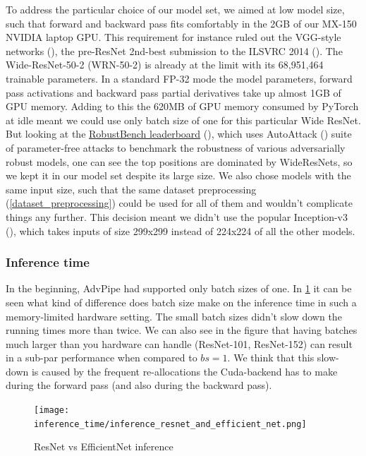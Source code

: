 To address the particular choice of our model set, we aimed at low model size, such that forward and backward pass fits comfortably in the 2GB of our MX-150 NVIDIA laptop GPU. This requirement for instance ruled out the VGG-style networks (\cite{simonyan2015deep}), the pre-ResNet 2nd-best submission to the ILSVRC 2014 (\cite{russakovsky2015imagenet}). The Wide-ResNet-50-2 (WRN-50-2) is already at the limit with its 68,951,464 trainable parameters. In a standard FP-32 mode the model parameters, forward pass activations and backward pass partial derivatives take up almost 1GB of GPU memory. Adding to this the 620MB of GPU memory consumed by PyTorch at idle meant we could use only batch size of one for this particular Wide ResNet. But looking at the \href{https://robustbench.github.io/}{RobustBench leaderboard} (\cite{croce2021robustbench}), which uses AutoAttack (\cite{croce2020reliable}) suite of parameter-free attacks to benchmark the robustness of various adversarially robust models, one can see the top positions are dominated by WideResNets, so we kept it in our model set despite its large size.
We also chose models with the same input size, such that the same dataset preprocessing (\ref{dataset_preprocessing}) could be used for all of them and wouldn't complicate things any further. This decision meant we didn't use the popular Inception-v3 (\cite{szegedy2015rethinking}), which takes inputs of size 299x299 instead of 224x224 of all the other models.

\subsubsection{Inference time}
In the beginning, AdvPipe had supported only batch sizes of one. In \ref{fig:inference_time} it can be seen what kind of difference does batch size make on the inference time in such a memory-limited hardware setting. The small batch sizes didn't slow down the running times more than twice. We can also see in the figure that having batches much larger than you hardware can handle (ResNet-101, ResNet-152) can result in a sub-par performance when compared to $bs=1$. We think that this slow-down is caused by the frequent re-allocations the Cuda-backend has to make during the forward pass (and also during the backward pass).

\begin{figure}[!htb]
  \texttt{[image: inference\_time/inference\_resnet\_and\_efficient\_net.png]}
\caption{ResNet vs EfficientNet inference}
\label{fig:inference_time}
\end{figure}



